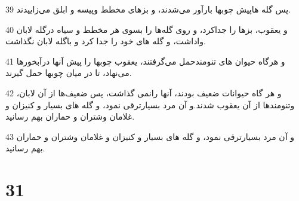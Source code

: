 \par 39 پس گله هاپیش چوبها بارآور می‌شدند، و بزهای مخطط وپیسه و ابلق می‌زاییدند.
\par 40 و یعقوب، بزها را جداکرد، و روی گله‌ها را بسوی هر مخطط و سیاه درگله لابان واداشت، و گله های خود را جدا کرد و باگله لابان نگذاشت.
\par 41 و هرگاه حیوان های تنومندحمل می‌گرفتند، یعقوب چوبها را پیش آنها درآبخورها می‌نهاد، تا در میان چوبها حمل گیرند.
\par 42 و هر گاه حیوانات ضعیف بودند، آنها رانمی گذاشت، پس ضعیف‌ها از آن لابان، وتنومندها از آن یعقوب شدند.و آن مرد بسیارترقی نمود، و گله های بسیار و کنیزان و غلامان وشتران و حماران بهم رسانید.
\par 43 و آن مرد بسیارترقی نمود، و گله های بسیار و کنیزان و غلامان وشتران و حماران بهم رسانید.
 
\chapter{31}

